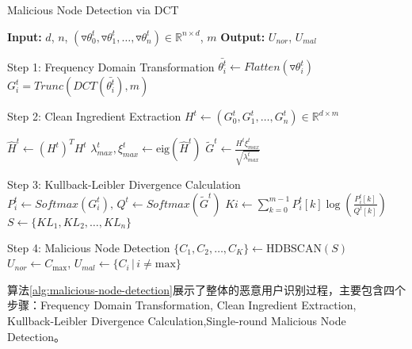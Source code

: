 \documentclass[lettersize,journal]{IEEEtran}
\begin{document}
\begin{algorithm}
\caption{Malicious Node Detection via DCT}
\label{alg:malicious-node-detection}
\begin{algorithmic}[1]
\State \textbf{Input:} $d$, $n$, $(\triangledown \theta_0^t, \triangledown \theta_1^t, \ldots, \triangledown \theta_n^t) \in \mathbb{R}^{n \times d}$, $m$ 
\State \textbf{Output:} $U_{nor}$, $U_{mal}$ 

\State Step 1: Frequency Domain Transformation
    \State $\bar{\theta_i^t} \gets Flatten(\triangledown \theta_i^t)$
    \State $G_i^t = Trunc(DCT(\bar{\theta_i^t}), m)$ 
\EndFor

\State

\State Step 2: Clean Ingredient Extraction
\State $H^t \gets (G_0^t, G_1^t, \ldots, G_{n}^t) \in \mathbb{R}^{d \times m}$ 

\State $\hat{H}^t \gets (H^t)^{T} H^t$
\State $\lambda_{max}^t, \xi_{max}^t \gets \text{eig}(\hat{H}^t)$ 
\State $\tilde{G}^t \gets \frac{H^t \xi_{max}^t}{\sqrt{\lambda_{max}^t}}$ 

\State

\State Step 3: Kullback-Leibler Divergence Calculation
\State $P_i^t \gets Softmax(G_i^t), \, Q^t \gets Softmax(\tilde{G}^t)$
    \State $Ki \gets \sum_{k=0}^{m-1} P_i^t[k] \log \left( \frac{P_i^t[k]}{Q^t[k]} \right)$
\EndFor
\State $S \gets \{KL_1, KL_2, \ldots, KL_n\}$ 

\State

\State Step 4: Malicious Node Detection
\State $\{C_1, C_2, \ldots, C_K\} \gets \text{HDBSCAN}(S)$
\State $U_{nor} \gets C_{\text{max}}$, $U_{mal} \gets \{C_i \, | \, i \neq \text{max}\}$

\end{algorithmic}
\end{algorithm}
算法\ref{alg:malicious-node-detection}展示了整体的恶意用户识别过程，主要包含四个步骤：Frequency Domain Transformation, Clean Ingredient Extraction, Kullback-Leibler Divergence Calculation,Single-round Malicious Node Detection。
\end{document}
